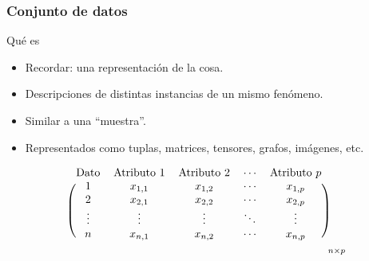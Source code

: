 \documentclass[table]{beamer}
\begin{document}
\begin{frame}
    \frametitle{Conjunto de datos}
    \begin{block}{Qué es}
        \begin{itemize}
            \item Recordar: una representación de la cosa.
            \item Descripciones de distintas instancias de un mismo fenómeno.
            \item Similar a una ``muestra''.
            \item Representados como tuplas, matrices, tensores, grafos, imágenes, etc.
        \end{itemize}
    \end{block}
    \begin{equation*}
        \begin{blockarray}{*{5}c}
            \text{Dato} & \text{Atributo } 1 & \text{Atributo } 2 & \cdots & \text{Atributo } p \\
            \begin{block}{(*{5}{c})}
                1 & x_{1 , 1} & x_{1, 2} & \cdots & x_{1 , p} \\
                2 & x_{2 , 1} & x_{2, 2} & \cdots & x_{2 , p} \\
                \vdots & \vdots & \vdots & \ddots & \vdots \\
                n & x_{n , 1} & x_{n, 2} & \cdots & x_{n , p} \\
            \end{block}
        \end{blockarray}_{n \times p}
    \end{equation*}
\end{frame}
\end{document}
